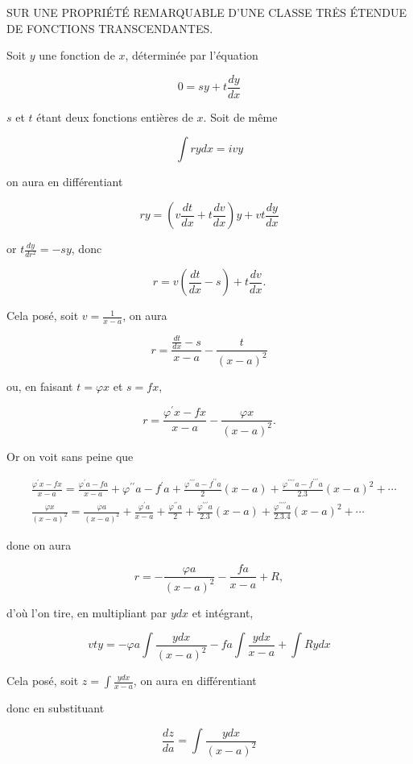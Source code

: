 \documentclass{article}
\begin{document}
SUR UNE PROPRIÉTÉ REMARQUABLE D'UNE CLASSE TRĖS ÉTENDUE DE FONCTIONS TRANSCENDANTES.

Soit \(y\) une fonction de \(x\), déterminée par l'équation

\[
0=s y+t \frac{d y}{d x}
\]

\(s\) et \(t\) étant deux fonctions entières de \(x\). Soit de même

\[
\int r y d x=i v y
\]

on aura en différentiant

\[
r y=\left(v \frac{d t}{d x}+t \frac{d v}{d x}\right) y+v t \frac{d y}{d x}
\]

or \(t \frac{d y}{d r^{2}}=-s y\), donc

\[
r=v\left(\frac{d t}{d x}-s\right)+t \frac{d v}{d x} .
\]

Cela posé, soit \(v=\frac{1}{x-a}\), on aura

\[
r=\frac{\frac{d t}{d x}-s}{x-a}-\frac{t}{(x-a)^{2}}
\]

ou, en faisant \(t=\varphi x\) et \(s=f x\),

\[
r=\frac{\varphi^{\prime} x-f x}{x-a}-\frac{\varphi x}{(x-a)^{2}} .
\]

Or on voit sans peine que

\[
\begin{aligned}
& \frac{\varphi^{\prime} x-f x}{x-a}=\frac{\varphi^{\prime} a-f a}{x-a}+\varphi^{\prime \prime} a-f^{\prime} a+\frac{\varphi^{\prime \prime \prime} a-f^{\prime \prime} a}{2}(x-a)+\frac{\varphi^{\prime \prime \prime \prime} a-f^{\prime \prime \prime} a}{2.3}(x-a)^{2}+\cdots \\
& \frac{\varphi x}{(x-a)^{2}}=\frac{\varphi a}{(x-a)^{2}}+\frac{\varphi^{\prime} a}{x-a}+\frac{\varphi^{\prime \prime} a}{2}+\frac{\varphi^{\prime \prime \prime} a}{2.3}(x-a)+\frac{\varphi^{\prime \prime \prime \prime} a}{2.3 .4}(x-a)^{2}+\cdots
\end{aligned}
\]

done on aura

\[
r=-\frac{\varphi a}{(x-a)^{2}}-\frac{f a}{x-a}+R,
\]

d'où l'on tire, en multipliant par \(y d x\) et intégrant,

\[
v t y=-\varphi a \int \frac{y d x}{(x-a)^{2}}-f a \int \frac{y d x}{x-a}+\int R y d x
\]

Cela posé, soit \(z=\int \frac{y d x}{x-a}\), on aura en différentiant

donc en substituant

\[
\frac{d z}{d a}=\int \frac{y d x}{(x-a)^{2}}
\]
\end{document}
